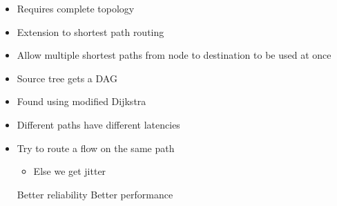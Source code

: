 \begin{itemize}
\begin{itemize}
\begin{itemize}
                    \item Requires complete topology
                \end{itemize}
        \end{itemize}
        \begin{itemize}
            \item Extension to shortest path routing
            \item Allow multiple shortest paths from node to destination to be used at once
            \item Source tree gets a DAG
            \item Found using modified Dijkstra
            \item Different paths have different latencies
            \item Try to route a flow on the same path
                \begin{itemize}
                    \item Else we get jitter
                \end{itemize}
            \ipro Better reliability
            \ipro Better performance
        \end{itemize}
\end{itemize}


